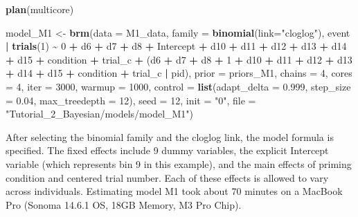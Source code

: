 \documentclass[
  man,floatsintext]{apa6}
\newenvironment{Shaded}{\begin{snugshade}}{\end{snugshade}}
\newcommand{\AttributeTok}[1]{\textcolor[rgb]{0.13,0.29,0.53}{#1}}
\newcommand{\DecValTok}[1]{\textcolor[rgb]{0.00,0.00,0.81}{#1}}
\newcommand{\FloatTok}[1]{\textcolor[rgb]{0.00,0.00,0.81}{#1}}
\newcommand{\FunctionTok}[1]{\textcolor[rgb]{0.13,0.29,0.53}{\textbf{#1}}}
\newcommand{\NormalTok}[1]{#1}
\newcommand{\OtherTok}[1]{\textcolor[rgb]{0.56,0.35,0.01}{#1}}
\newcommand{\SpecialCharTok}[1]{\textcolor[rgb]{0.81,0.36,0.00}{\textbf{#1}}}
\newcommand{\StringTok}[1]{\textcolor[rgb]{0.31,0.60,0.02}{#1}}
\begin{document}
\begin{Shaded}
\begin{Highlighting}[]
\FunctionTok{plan}\NormalTok{(multicore)}

\NormalTok{model\_M1 }\OtherTok{\textless{}{-}}
   \FunctionTok{brm}\NormalTok{(}\AttributeTok{data =}\NormalTok{ M1\_data,}
       \AttributeTok{family =} \FunctionTok{binomial}\NormalTok{(}\AttributeTok{link=}\StringTok{"cloglog"}\NormalTok{),}
\NormalTok{       event }\SpecialCharTok{|} \FunctionTok{trials}\NormalTok{(}\DecValTok{1}\NormalTok{) }\SpecialCharTok{\textasciitilde{}} \DecValTok{0} \SpecialCharTok{+}\NormalTok{ d6 }\SpecialCharTok{+}\NormalTok{ d7 }\SpecialCharTok{+}\NormalTok{ d8 }\SpecialCharTok{+}\NormalTok{ Intercept }\SpecialCharTok{+}\NormalTok{ d10 }\SpecialCharTok{+}\NormalTok{ d11 }\SpecialCharTok{+}\NormalTok{ d12 }\SpecialCharTok{+}\NormalTok{ d13 }\SpecialCharTok{+}\NormalTok{ d14 }\SpecialCharTok{+}\NormalTok{ d15 }\SpecialCharTok{+} 
\NormalTok{                           condition }\SpecialCharTok{+}\NormalTok{ trial\_c }\SpecialCharTok{+}
\NormalTok{                           (d6 }\SpecialCharTok{+}\NormalTok{ d7 }\SpecialCharTok{+}\NormalTok{ d8 }\SpecialCharTok{+} \DecValTok{1} \SpecialCharTok{+}\NormalTok{ d10 }\SpecialCharTok{+}\NormalTok{ d11 }\SpecialCharTok{+}\NormalTok{ d12 }\SpecialCharTok{+}\NormalTok{ d13 }\SpecialCharTok{+}\NormalTok{ d14 }\SpecialCharTok{+}\NormalTok{ d15 }\SpecialCharTok{+}\NormalTok{ condition }\SpecialCharTok{+}\NormalTok{ trial\_c }\SpecialCharTok{|}\NormalTok{ pid),}
       \AttributeTok{prior =}\NormalTok{ priors\_M1,}
       \AttributeTok{chains =} \DecValTok{4}\NormalTok{, }\AttributeTok{cores =} \DecValTok{4}\NormalTok{, }\AttributeTok{iter =} \DecValTok{3000}\NormalTok{, }\AttributeTok{warmup =} \DecValTok{1000}\NormalTok{,}
       \AttributeTok{control =} \FunctionTok{list}\NormalTok{(}\AttributeTok{adapt\_delta =} \FloatTok{0.999}\NormalTok{, }\AttributeTok{step\_size =} \FloatTok{0.04}\NormalTok{, }\AttributeTok{max\_treedepth =} \DecValTok{12}\NormalTok{),}
       \AttributeTok{seed =} \DecValTok{12}\NormalTok{, }\AttributeTok{init =} \StringTok{"0"}\NormalTok{,}
       \AttributeTok{file =} \StringTok{"Tutorial\_2\_Bayesian/models/model\_M1"}\NormalTok{)}
\end{Highlighting}
\end{Shaded}

\normalsize

After selecting the binomial family and the cloglog link, the model formula is specified. The fixed effects include 9 dummy variables, the explicit Intercept variable (which represents bin 9 in this example), and the main effects of priming condition and centered trial number. Each of these effects is allowed to vary across individuals.
Estimating model M1 took about 70 minutes on a MacBook Pro (Sonoma 14.6.1 OS, 18GB Memory, M3 Pro Chip).
\end{document}

